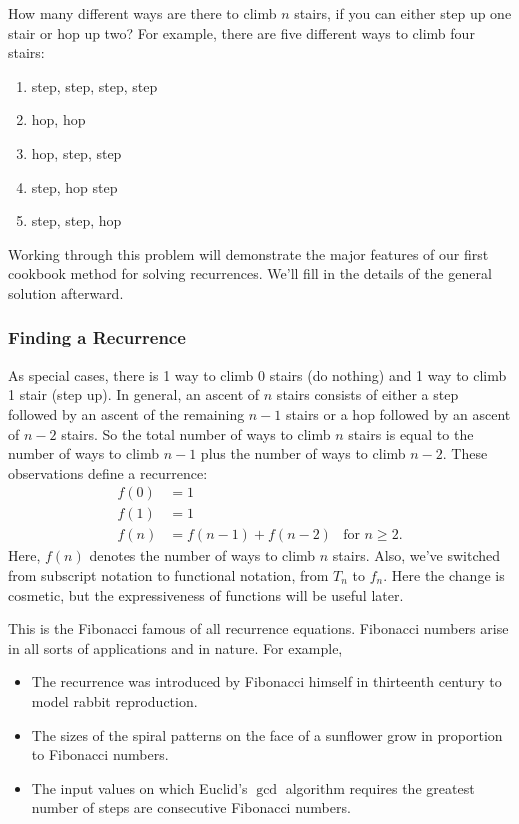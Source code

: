 How many different ways are there to climb $n$ stairs, if you can
either step up one stair or hop up two?  For example, there are five
different ways to climb four stairs:
\begin{enumerate}
\item step, step, step, step
\item hop, hop
\item hop, step, step
\item step, hop step
\item step, step, hop
\end{enumerate}

\noindent Working through this problem will demonstrate the major
features of our first cookbook method for solving recurrences.  We'll
fill in the details of the general solution afterward.

\subsubsection{Finding a Recurrence}

As special cases, there is 1 way to climb 0 stairs (do nothing) and 1
way to climb 1 stair (step up).  In general, an ascent of $n$ stairs
consists of either a step followed by an ascent of the remaining $n -
1$ stairs or a hop followed by an ascent of $n - 2$ stairs.  So the
total number of ways to climb $n$ stairs is equal to the number of
ways to climb $n-1$ plus the number of ways to climb $n-2$.  These
observations define a recurrence:
\begin{align*}
f(0) & = 1 \\
f(1) & = 1 \\
f(n) & = f(n-1) + f(n-2) &\text{for $n \geq 2$}.
\end{align*}
Here, $f(n)$ denotes the number of ways to climb $n$ stairs.  Also,
we've switched from subscript notation to functional notation, from
$T_n$ to $f_n$.  Here the change is cosmetic, but the expressiveness
of functions will be useful later.

This is the Fibonacci%
famous of all recurrence equations.  Fibonacci numbers arise in all
sorts of applications and in nature.  For example,
\begin{itemize}
\item The recurrence was introduced by Fibonacci himself in thirteenth
  century to model rabbit reproduction.

\item The sizes of the spiral patterns on the face of a sunflower grow
  in proportion to Fibonacci numbers.

\item The input values on which Euclid's $\gcd$ algorithm requires the
  greatest number of steps are consecutive Fibonacci numbers.
\end{itemize}

